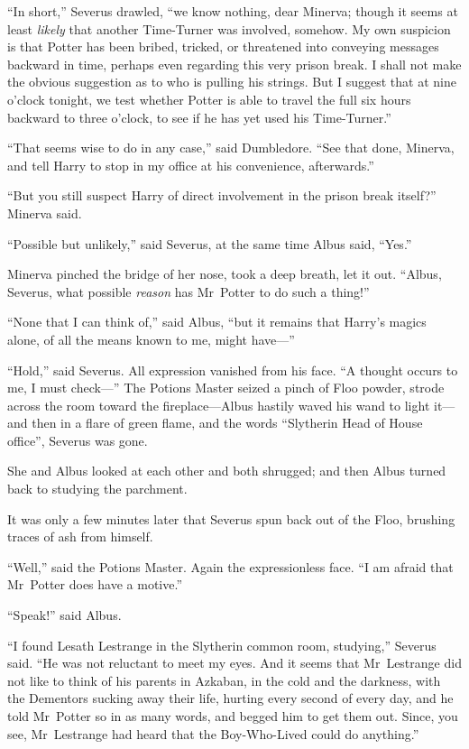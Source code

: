 “In short,” Severus drawled, “we know nothing, dear Minerva; though it seems at least \emph{likely} that another Time-Turner was involved, somehow. My own suspicion is that Potter has been bribed, tricked, or threatened into conveying messages backward in time, perhaps even regarding this very prison break. I shall not make the obvious suggestion as to who is pulling his strings. But I suggest that at nine o’clock tonight, we test whether Potter is able to travel the full six hours backward to three o’clock, to see if he has yet used his Time-Turner.”

“That seems wise to do in any case,” said Dumbledore. “See that done, Minerva, and tell Harry to stop in my office at his convenience, afterwards.”

“But you still suspect Harry of direct involvement in the prison break itself?” Minerva said.

“Possible but unlikely,” said Severus, at the same time Albus said, “Yes.”

Minerva pinched the bridge of her nose, took a deep breath, let it out. “Albus, Severus, what possible \emph{reason} has Mr~Potter to do such a thing!”

“None that I can think of,” said Albus, “but it remains that Harry’s magics alone, of all the means known to me, might have—”

“Hold,” said Severus. All expression vanished from his face. “A thought occurs to me, I must check—” The Potions Master seized a pinch of Floo powder, strode across the room toward the fireplace—Albus hastily waved his wand to light it—and then in a flare of green flame, and the words “Slytherin Head of House office”, Severus was gone.

She and Albus looked at each other and both shrugged; and then Albus turned back to studying the parchment.

It was only a few minutes later that Severus spun back out of the Floo, brushing traces of ash from himself.

“Well,” said the Potions Master. Again the expressionless face. “I am afraid that Mr~Potter does have a motive.”

“Speak!” said Albus.

“I found Lesath Lestrange in the Slytherin common room, studying,” Severus said. “He was not reluctant to meet my eyes. And it seems that Mr~Lestrange did not like to think of his parents in Azkaban, in the cold and the darkness, with the Dementors sucking away their life, hurting every second of every day, and he told Mr~Potter so in as many words, and begged him to get them out. Since, you see, Mr~Lestrange had heard that the Boy-Who-Lived could do anything.”


